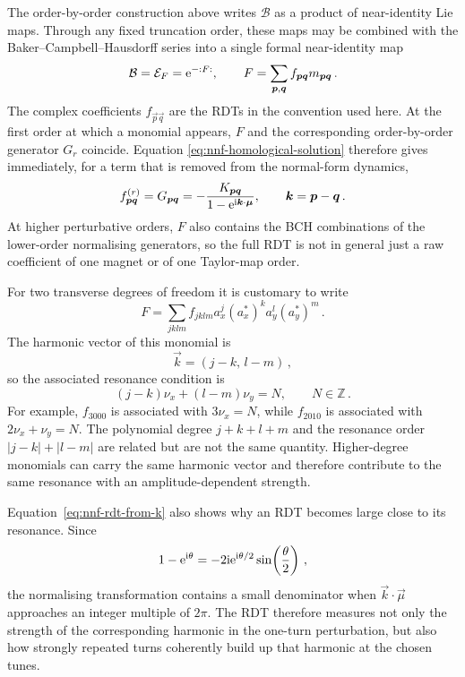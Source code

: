 The order-by-order construction above writes $\mathcal B$ as a product of
near-identity Lie maps.  Through any fixed truncation order, these maps may be
combined with the Baker--Campbell--Hausdorff series into a single formal
near-identity map
\begin{equation}\label{eq:nnf-rdt-generator}
    \mathcal B = \mathcal E_F = \mathrm{e}^{-:F:},
    \qquad
    F = \sum_{\bm{p},\bm{q}} f_{\bm{p}\bm{q}}
    m_{\bm{p}\bm{q}}\,.
\end{equation}
The complex coefficients $f_{\vec p\vec q}$ are the RDTs in the convention
used here.  At the first order at which a monomial appears, $F$ and the
corresponding order-by-order generator $G_r$ coincide.  Equation
\eqref{eq:nnf-homological-solution} therefore gives immediately, for a term
that is removed from the normal-form dynamics,
\begin{equation}\label{eq:nnf-rdt-from-k}
    f_{\bm{p}\bm{q}}^{(r)}
    = G_{\bm{p}\bm{q}}
    = -\frac{K_{\bm{p}\bm{q}}}
    {1-\mathrm{e}^{\mathrm{i}\bm{k}\cdot\bm{\mu}}},
    \qquad
    \bm{k} = \bm{p}-\bm{q}\,.
\end{equation}
At higher perturbative orders, $F$ also contains the BCH combinations of the
lower-order normalising generators, so the full RDT is not in general just a
raw coefficient of one magnet or of one Taylor-map order.

For two transverse degrees of freedom it is customary to write
\begin{equation}\label{eq:nnf-rdt-jklm}
    F = \sum_{jklm} f_{jklm}
    a_x^j(a_x^*)^k a_y^l(a_y^*)^m\,.
\end{equation}
The harmonic vector of this monomial is
\begin{equation}
    \vec k = (j-k,\,l-m)\,,
\end{equation}
so the associated resonance condition is
\begin{equation}\label{eq:nnf-rdt-resonance}
    (j-k)\nu_x + (l-m)\nu_y = N,
    \qquad N\in\mathbb Z\,.
\end{equation}
For example, $f_{3000}$ is associated with $3\nu_x=N$, while $f_{2010}$ is
associated with $2\nu_x+\nu_y=N$.  The polynomial degree
$j+k+l+m$ and the resonance order $|j-k|+|l-m|$ are related but are not the
same quantity.  Higher-degree monomials can carry the same harmonic vector and
therefore contribute to the same resonance with an amplitude-dependent
strength.

Equation~\eqref{eq:nnf-rdt-from-k} also shows why an RDT becomes large close
to its resonance.  Since
\begin{equation}
    1-\mathrm{e}^{\mathrm{i}\theta}
    = -2\mathrm{i}\mathrm{e}^{\mathrm{i}\theta/2}\sin\!\left(\frac{\theta}{2}\right)\,,
\end{equation}
the normalising transformation contains a small denominator when
$\vec k\cdot\vec\mu$ approaches an integer multiple of $2\pi$.  The RDT
therefore measures not only the strength of the corresponding harmonic in the
one-turn perturbation, but also how strongly repeated turns coherently build
up that harmonic at the chosen tunes.



